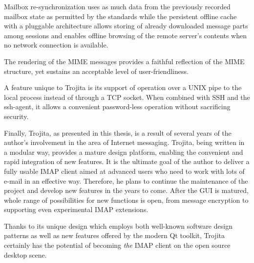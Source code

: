 \documentclass[12pt,notitlepage]{report}
\newcommand{\trojita}{Trojita\xspace}
\begin{document}
Mailbox re-synchronization uses as much data from the previously recorded
mailbox state as permitted by the standards while the persistent offline cache
with a pluggable architecture allows storing of already downloaded message parts
among sessions and enables offline browsing of the remote server's contents when
no network connection is available.

The rendering of the MIME messages provides a faithful reflection of the MIME
structure, yet sustains an acceptable level of user-friendliness.

A feature unique to \trojita is its support of operation over a UNIX pipe to the
local process instead of through a TCP socket.  When combined with SSH and the
ssh-agent, it allows a convenient password-less operation without sacrificing
security.

Finally, \trojita, as presented in this thesis, is a result of several years of
the author's involvement in the area of Internet messaging.  \trojita, being
written in a modular way, provides a mature design platform, enabling the
convenient and rapid integration of new features.  It is the ultimate goal of
the author to deliver a fully usable IMAP client aimed at advanced users who
need to work with lots of e-mail in an effective way.  Therefore, he plans to
continue the maintenance of the project and develop new features in the years to
come.  After the GUI is matured, whole range of possibilities for new functions
is open, from message encryption to supporting even experimental IMAP
extensions.

Thanks to its unique design which employs both well-known software design
patterns as well as new features offered by the modern Qt toolkit, \trojita
certainly has the potential of becoming {\em the} IMAP client on the open source
desktop scene.
\end{document}
